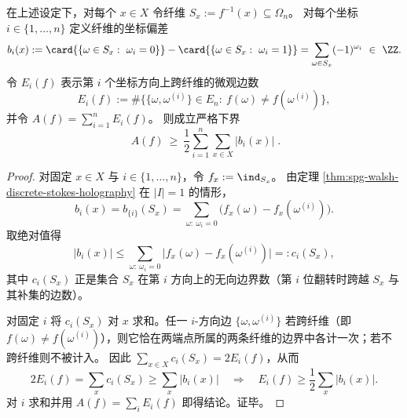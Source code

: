 \begin{theorem}\label{thm:spg-fiber-walsh-l1-area-lower-bound}
在上述设定下，对每个 \(x\in X\) 令纤维
\(
S_x:=f^{-1}(x)\subseteq \Omega_n
\)。
对每个坐标 \(i\in\{1,\dots,n\}\) 定义纤维的坐标偏差
\[
b_i(x)
:=\card{\{\omega\in S_x:\ \omega_i=0\}}-\card{\{\omega\in S_x:\ \omega_i=1\}}
=\sum_{\omega\in S_x}(-1)^{\omega_i}\ \in\ \ZZ.
\]
令 \(E_i(f)\) 表示第 \(i\) 个坐标方向上跨纤维的微观边数
\[
E_i(f):=\#\bigl\{\{\omega,\omega^{(i)}\}\in E_n:\ f(\omega)\neq f(\omega^{(i)})\bigr\},
\]
并令 \(A(f)=\sum_{i=1}^{n}E_i(f)\)。
则成立严格下界
\[
\boxed{\;
A(f)\ \ge\ \frac12\sum_{i=1}^{n}\sum_{x\in X}\bigl|b_i(x)\bigr|\; }.
\]
\end{theorem}
\begin{proof}
对固定 \(x\in X\) 与 \(i\in\{1,\dots,n\}\)，令 \(f_x:=\ind_{S_x}\)。
由定理 \ref{thm:spg-walsh-discrete-stokes-holography} 在 \(|I|=1\) 的情形，
\[
b_i(x)=b_{\{i\}}(S_x)=\sum_{\omega:\ \omega_i=0}\bigl(f_x(\omega)-f_x(\omega^{(i)})\bigr).
\]
取绝对值得
\[
\bigl|b_i(x)\bigr|
\le
\sum_{\omega:\ \omega_i=0}\bigl|f_x(\omega)-f_x(\omega^{(i)})\bigr|
=:c_i(S_x),
\]
其中 \(c_i(S_x)\) 正是集合 \(S_x\) 在第 \(i\) 方向上的无向边界数（第 \(i\) 位翻转时跨越 \(S_x\) 与其补集的边数）。
\par
对固定 \(i\) 将 \(c_i(S_x)\) 对 \(x\) 求和。任一 \(i\)-方向边 \(\{\omega,\omega^{(i)}\}\) 若跨纤维（即 \(f(\omega)\neq f(\omega^{(i)})\)），则它恰在两端点所属的两条纤维的边界中各计一次；若不跨纤维则不被计入。
因此
\(
\sum_{x\in X}c_i(S_x)=2E_i(f)
\)，从而
\[
2E_i(f)=\sum_{x}c_i(S_x)\ge \sum_x |b_i(x)|
\quad\Longrightarrow\quad
E_i(f)\ge \frac12\sum_x |b_i(x)|.
\]
对 \(i\) 求和并用 \(A(f)=\sum_i E_i(f)\) 即得结论。证毕。
\end{proof}

